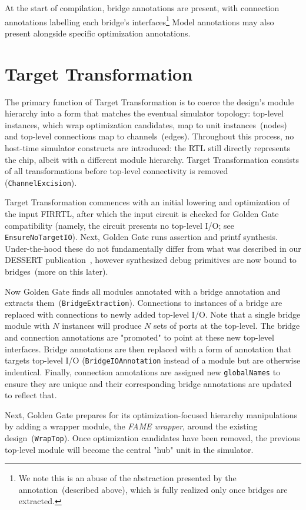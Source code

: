At the start of compilation, bridge annotations are present, with connection
annotations labelling each bridge's interfaces\footnote{We note this is an abuse of the
abstraction presented by the annotation~(described above), which is fully realized only once bridges are extracted.}
Model annotations may also present alongside specific optimization annotations.

\section{Target Transformation}

The primary function of Target Transformation is to coerce the design's module
hierarchy into a form that matches the eventual simulator topology: top-level
instances, which wrap optimization candidates, map to unit instances~(nodes) and top-level connections map to
channels~(edges). Throughout this process, no host-time simulator constructs
are introduced: the RTL still directly represents the chip, albeit with a different module hierarchy.  Target Transformation
consists of all transformations before top-level connectivity is removed
(\texttt{ChannelExcision}).

Target Transformation commences with an initial lowering and optimization of the input FIRRTL, after which
the input circuit is checked for Golden Gate compatibility (namely, the circuit
presents no top-level I/O; see \texttt{EnsureNoTargetIO}). Next, Golden Gate
runs assertion and printf synthesis. Under-the-hood these do not fundamentally differ
from what was described in our DESSERT publication~\cite{DESSERT}, however
synthesized debug primitives are now bound to bridges~(more on this later).

Now Golden Gate finds all modules annotated with a bridge annotation and extracts
them~(\texttt{BridgeExtraction}). Connections to instances of
a bridge are replaced with connections to newly added
top-level I/O. Note that a single bridge module with $N$ instances will produce $N$
sets of ports at the top-level. The bridge and connection annotations are
"promoted" to point at these new top-level interfaces. Bridge annotations are then
replaced with a form of annotation that targets top-level I/O
(\texttt{BridgeIOAnnotation} instead of a module but are otherwise indentical.
Finally, connection annotations are assigned new \texttt{globalNames} to ensure they
are unique and their corresponding bridge annotations are updated to reflect
that.

Next, Golden Gate prepares for its optimization-focused hierarchy manipulations
by adding a wrapper module, the \emph{FAME wrapper}, around the existing
design~(\texttt{WrapTop}). Once optimization candidates have been removed, the
previous top-level module will become the central "hub" unit in the simulator.

